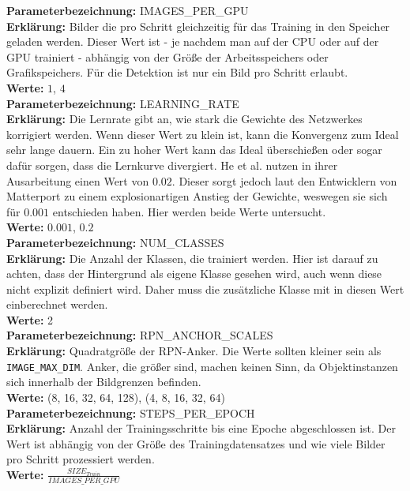 \noindent
\textbf{Parameterbezeichnung:} IMAGES\_PER\_GPU\\
\textbf{Erklärung:} Bilder die pro Schritt gleichzeitig für das Training in den Speicher geladen werden. Dieser Wert ist - je nachdem man auf der CPU oder auf der GPU trainiert - abhängig von der Größe der Arbeitsspeichers oder Grafikspeichers. Für die Detektion ist nur ein Bild pro Schritt erlaubt.\\
\textbf{Werte:} $1$, $4$\\

\noindent
\textbf{Parameterbezeichnung:} LEARNING\_RATE\\
\textbf{Erklärung:} Die Lernrate gibt an, wie stark die Gewichte des Netzwerkes korrigiert werden. Wenn dieser Wert zu klein ist, kann die Konvergenz zum Ideal sehr lange dauern. Ein zu hoher Wert kann das Ideal überschießen oder sogar dafür sorgen, dass die Lernkurve divergiert. He et al. nutzen in ihrer Ausarbeitung einen Wert von $0.02$.\cite{ref:maskrcnn} Dieser sorgt jedoch laut den Entwicklern von Matterport zu einem explosionartigen Anstieg der Gewichte, weswegen sie sich für $0.001$ entschieden haben.\cite{ref:matterport} Hier werden beide Werte untersucht.\\
\textbf{Werte:} $0.001$, $0.2$\\

\noindent
\textbf{Parameterbezeichnung:} NUM\_CLASSES\\
\textbf{Erklärung:} Die Anzahl der Klassen, die trainiert werden. Hier ist darauf zu achten, dass der Hintergrund als eigene Klasse gesehen wird, auch wenn diese nicht explizit definiert wird. Daher muss die zusätzliche Klasse mit in diesen Wert einberechnet werden.\\
\textbf{Werte:} 2\\

\noindent
\textbf{Parameterbezeichnung:} RPN\_ANCHOR\_SCALES\\
\textbf{Erklärung:} Quadratgröße der RPN-Anker. Die Werte sollten kleiner sein als \texttt{IMAGE\_MAX\_DIM}. Anker, die größer sind, machen keinen Sinn, da Objektinstanzen sich innerhalb der Bildgrenzen befinden.\\
\textbf{Werte:} (8, 16, 32, 64, 128), (4, 8, 16, 32, 64)\\

\noindent
\textbf{Parameterbezeichnung:} STEPS\_PER\_EPOCH\\
\textbf{Erklärung:} Anzahl der Trainingsschritte bis eine Epoche abgeschlossen ist. Der Wert ist abhängig von der Größe des Trainingdatensatzes und wie viele Bilder pro Schritt prozessiert werden.\\
\textbf{Werte:} $\frac{SIZE_{Train}}{IMAGES\_PER\_GPU}$\\

